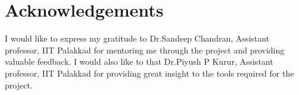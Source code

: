 \chapter*{\centering Acknowledgements}
\quad I would like to express my gratitude to Dr.Sandeep Chandran, Assistant professor, IIT Palakkad for
mentoring me through the project and providing valuable feedback. I would also like to that 
Dr.Piyush P Kurur, Assistant professor, IIT Palakkad for providing great insight to the tools required
for the project.

